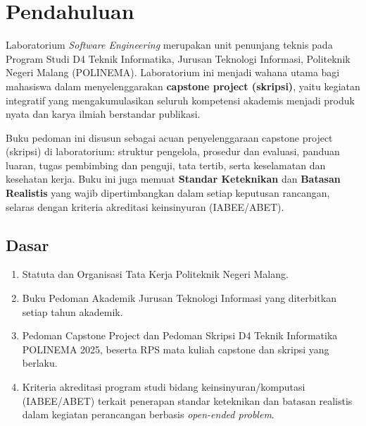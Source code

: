 \documentclass[12pt,a4paper]{report}
\begin{document}
\PedomanCover

\clearpage
\tableofcontents

\clearpage
{}

\chapter{Pendahuluan}

Laboratorium \emph{Software Engineering} merupakan unit penunjang teknis pada Program Studi D4 Teknik Informatika, Jurusan Teknologi Informasi, Politeknik Negeri Malang (POLINEMA). Laboratorium ini menjadi wahana utama bagi mahasiswa dalam menyelenggarakan \textbf{capstone project (skripsi)}, yaitu kegiatan integratif yang mengakumulasikan seluruh kompetensi akademis menjadi produk nyata dan karya ilmiah berstandar publikasi.

Buku pedoman ini disusun sebagai acuan penyelenggaraan capstone project (skripsi) di laboratorium: struktur pengelola, prosedur dan evaluasi, panduan luaran, tugas pembimbing dan penguji, tata tertib, serta keselamatan dan kesehatan kerja. Buku ini juga memuat \textbf{Standar Keteknikan} dan \textbf{Batasan Realistis} yang wajib dipertimbangkan dalam setiap keputusan rancangan, selaras dengan kriteria akreditasi keinsinyuran (IABEE/ABET).

\section{Dasar}
\begin{enumerate}
\item Statuta dan Organisasi Tata Kerja Politeknik Negeri Malang.
\item Buku Pedoman Akademik Jurusan Teknologi Informasi yang diterbitkan setiap tahun akademik.
\item Pedoman Capstone Project dan Pedoman Skripsi D4 Teknik Informatika POLINEMA 2025, beserta RPS mata kuliah capstone dan skripsi yang berlaku.
\item Kriteria akreditasi program studi bidang keinsinyuran/komputasi (IABEE/ABET) terkait penerapan standar keteknikan dan batasan realistis dalam kegiatan perancangan berbasis \emph{open-ended problem}.
\end{enumerate}
\end{document}
